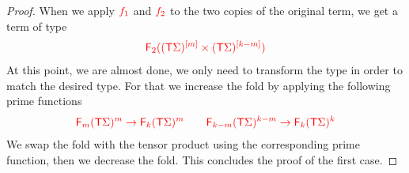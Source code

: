 \begin{proof}
When we apply $\ranked{f_1}$ and $\ranked{f_2}$ to the two copies of the original term, we get a term of type 
\begin{align*}
\ranked{ \reduce 2 (\mati m {(\tmonad \Sigma)}\product  \mati {k-m} {(\tmonad\Sigma)})}
\end{align*}
At this point, we are almost done, we only need to transform the type in order to match the desired type. For that we increase the fold by applying the following prime functions
\begin{align*}
\ranked{\reduce m (\tmonad \Sigma)^m \to \reduce k (\tmonad \Sigma)^m \qquad \reduce {k-m} (\tmonad \Sigma)^{k-m} \to \reduce k (\tmonad \Sigma)^{k} }
\end{align*}
We swap the fold with the tensor product using the corresponding prime function, then we decrease the fold. This concludes the proof of the first case.
\medskip


\end{proof}

